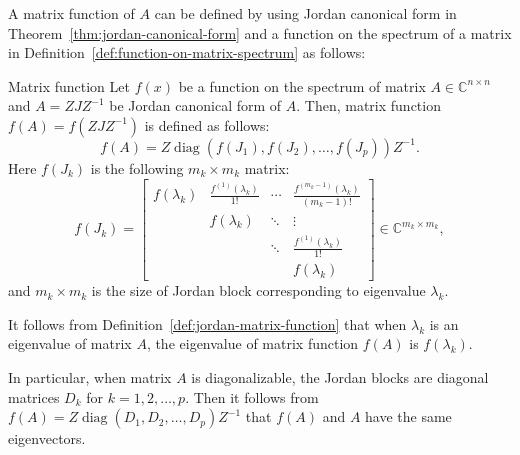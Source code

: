{A matrix function of $A$ can be defined by using Jordan canonical form in Theorem~\ref{thm:jordan-canonical-form} and a function on the spectrum of a matrix in Definition~\ref{def:function-on-matrix-spectrum} as follows:}

\begin{Definition}{{Matrix function}}\label{def:jordan-matrix-function}
{Let $f(x)$ be a function on the spectrum of matrix $A\in\mathbb{C}^{n\times n}$ and $A=ZJZ^{-1}$ be Jordan canonical form of $A$. Then, matrix function $f(A)=f(ZJZ^{-1})$ is defined as follows:}
\[f(A)=Z\operatorname{diag}(f(J_1),f(J_2),\ldots,f(J_p))Z^{-1}.\]
{Here $f(J_k)$ is the following $m_k\times m_k$ matrix:}
\[
f(J_k)=\begin{bmatrix}f(\lambda_k)&\frac{f^{(1)}(\lambda_k)}{1!}&\cdots&\frac{f^{(m_k-1)}(\lambda_k)}{(m_k-1)!}\\&f(\lambda_k)&\ddots&\vdots\\&&\ddots&\frac{f^{(1)}(\lambda_k)}{1!}\\&&&f(\lambda_k)\end{bmatrix}\in\mathbb{C}^{m_k\times m_k},
\]
{and $m_k\times m_k$ is the size of Jordan block corresponding to eigenvalue $\lambda_k$.}
\end{Definition}

{It follows from Definition~\ref{def:jordan-matrix-function} that when $\lambda_k$ is an eigenvalue of matrix $A$, the eigenvalue of matrix function $f(A)$ is $f(\lambda_k)$.}

{In particular, when matrix $A$ is diagonalizable, the Jordan blocks are diagonal matrices $D_k$ for $k=1,2,\ldots,p$. Then it follows from $f(A)=Z\operatorname{diag}(D_1,D_2,\ldots,D_p)Z^{-1}$ that $f(A)$ and $A$ have the same eigenvectors.}

